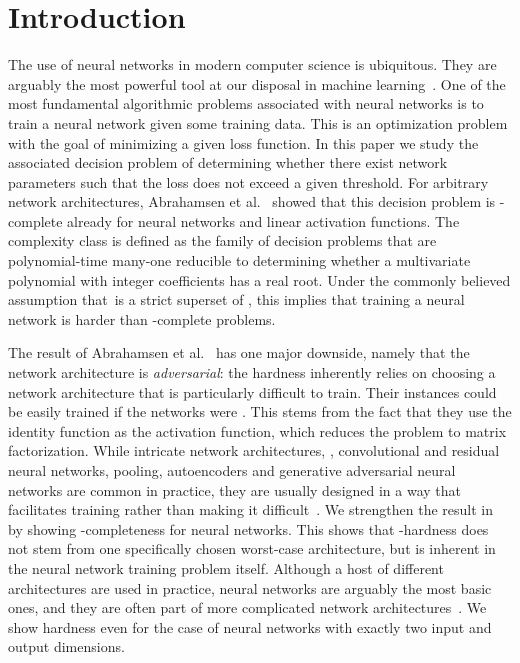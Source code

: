 \documentclass{toc}
\begin{document}
\section{Introduction}
The %
use  %
of neural networks in modern computer science is ubiquitous.
They are arguably the most powerful tool at our
%
disposal  %
in machine learning~\cite{Goodfellow2016_DeepLearning}.
One of the most fundamental algorithmic problems associated with neural networks is to
train a neural network given some training data. 
%
This is an optimization problem with the goal of minimizing a given loss function.
In this paper we study the associated decision problem of determining whether there exist network
parameters such that the loss does not exceed a given threshold.
%
For arbitrary network architectures, Abrahamsen et al.~\cite{Abrahamsen2021_NeuralNetworks}
showed that 
%
this decision
%
%
%
%
problem is \ER-complete already for \twolayer neural networks and linear activation functions.
%
%
%
%
%
The complexity class \ER is defined as the family of decision problems that are polynomial-time
many-one reducible to determining whether a multivariate polynomial with integer coefficients
has a real root.
%
%
%
%
%
Under the commonly believed assumption that~\ER is a strict superset of \NP, 
%
%
%
%
this implies that training a neural network is harder than \NP-complete problems.

The result of Abrahamsen et al.~\cite{Abrahamsen2021_NeuralNetworks} has one major
downside, namely that the network architecture is \emph{adversarial}:
%
the  %
hardness inherently relies on choosing a network architecture that is particularly
difficult to train.
Their instances could be easily trained if the networks were \fullyconnected.
This stems from the fact that they use the identity function as the activation function,
which reduces the problem to matrix factorization.
While intricate network architectures, \eg, convolutional and residual neural networks, pooling, autoencoders and generative adversarial neural networks are common in practice, they are usually designed in a way that facilitates training rather than making it difficult~\cite{Goodfellow2016_DeepLearning}.
We strengthen the result in~\cite{Abrahamsen2021_NeuralNetworks} by showing \ER-completeness for \emph{\fullyconnected} \twolayer neural networks.
This shows that \ER-hardness does not stem from one specifically chosen worst-case architecture, but is inherent in the neural network training problem itself.
Although a host of different architectures are used in practice, \fullyconnected \twolayer neural networks are arguably the most basic ones, and they are often part of more complicated network architectures~\cite{Goodfellow2016_DeepLearning}.
We show hardness even for the case of \fullyconnected \twolayer \ReLU neural networks with exactly two input and output dimensions.
\end{document}
